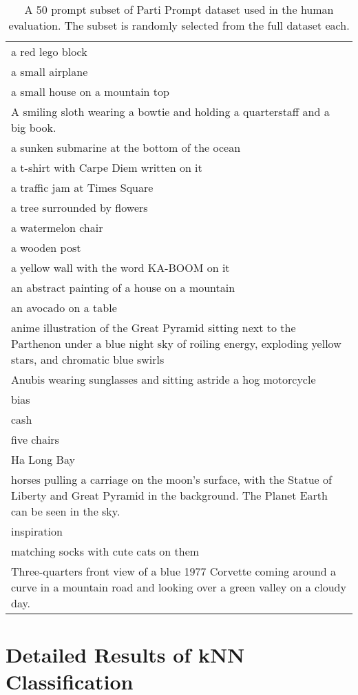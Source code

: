 \begin{table*}[p]
\begin{tabular}{|p{\textwidth}|}
a red lego block \\
a small airplane \\
a small house on a mountain top \\
A smiling sloth wearing a bowtie and holding a quarterstaff and a big book. \\
a sunken submarine at the bottom of the ocean \\
a t-shirt with Carpe Diem written on it \\
a traffic jam at Times Square \\
a tree surrounded by flowers \\
a watermelon chair \\
a wooden post \\
a yellow wall with the word KA-BOOM on it \\
an abstract painting of a house on a mountain \\
an avocado on a table \\
anime illustration of the Great Pyramid sitting next to the Parthenon under a blue night sky of roiling energy, exploding yellow stars, and chromatic blue swirls \\
Anubis wearing sunglasses and sitting astride a hog motorcycle \\
bias \\
cash \\
five chairs \\
Ha Long Bay \\
horses pulling a carriage on the moon's surface, with the Statue of Liberty and Great Pyramid in the background. The Planet Earth can be seen in the sky. \\
inspiration \\
matching socks with cute cats on them \\
Three-quarters front view of a blue 1977 Corvette coming around a curve in a mountain road and looking over a green valley on a cloudy day. \\
\hline
\end{tabular}
\caption{A 50 prompt subset of Parti Prompt dataset used in the human evaluation. The subset is randomly selected from the full dataset each.}
\label{tab:pp_subset}
\end{table*}

\section{Detailed Results of kNN Classification}

